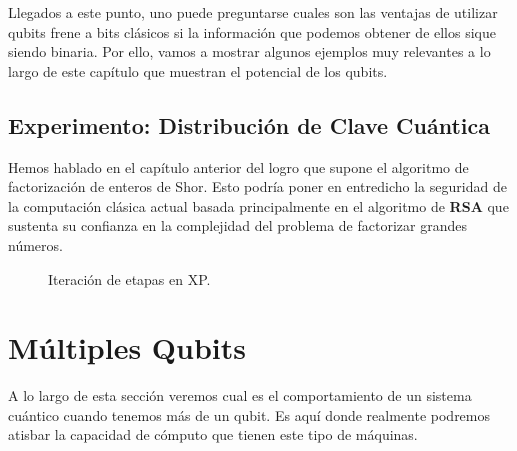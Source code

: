 Llegados a este punto, uno puede preguntarse cuales son las ventajas de utilizar qubits frene a bits clásicos si la información que podemos obtener de ellos sique siendo binaria. Por ello, vamos a mostrar algunos ejemplos muy relevantes a lo largo de este capítulo que muestran el potencial de los qubits.

\subsection{Experimento: Distribución de Clave Cuántica}

Hemos hablado en el capítulo anterior del logro que supone el algoritmo de factorización de enteros de Shor. Esto podría poner en entredicho la seguridad de la computación clásica actual basada principalmente en el algoritmo de \textbf{RSA} que sustenta su confianza en la complejidad del problema de factorizar grandes números.

\begin{figure}[!htb]
\begin{center}
\end{center}
\caption{Iteración de etapas en XP.}
\label{fig:fig21}

\end{figure}

\section{Múltiples Qubits}

A lo largo de esta sección veremos cual es el comportamiento de un sistema cuántico cuando tenemos más de un qubit. Es aquí donde realmente podremos atisbar la capacidad de cómputo que tienen este tipo de máquinas.

